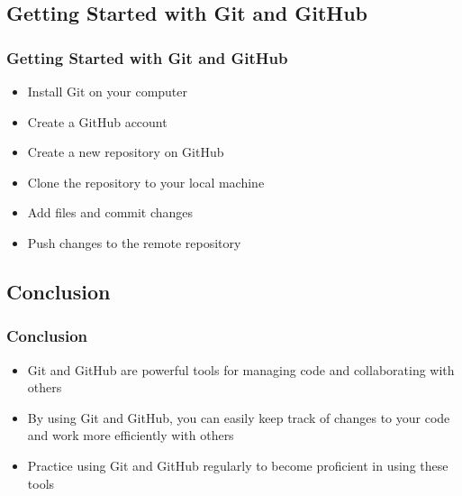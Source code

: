 \documentclass[9pt,table,xcolor=dvipsnames]{beamer}%
\theoremstyle{definition}
\theoremstyle{plain}
\begin{document}
\subsection{Getting Started with Git and GitHub}
\begin{frame}
  \frametitle{Getting Started with Git and GitHub}
  \begin{itemize}
    \item Install Git on your computer
    \item Create a GitHub account
    \item Create a new repository on GitHub
    \item Clone the repository to your local machine
    \item Add files and commit changes
    \item Push changes to the remote repository
  \end{itemize}
\end{frame}
\subsection{Conclusion}
\begin{frame}
  \frametitle{Conclusion}
  \begin{itemize}
    \item Git and GitHub are powerful tools for managing code and collaborating with others
    \item By using Git and GitHub, you can easily keep track of changes to your code and work more efficiently with others
    \item Practice using Git and GitHub regularly to become proficient in using these tools
  \end{itemize}
\end{frame}
\end{document}
